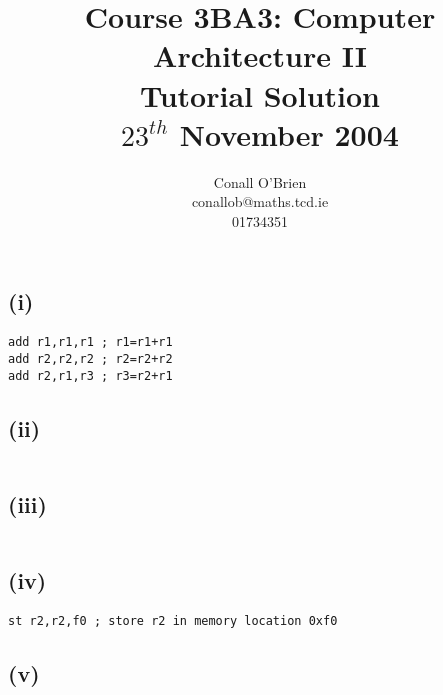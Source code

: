 \documentclass[a4paper,12pt]{article}
\begin{document}
\title{Course 3BA3: Computer Architecture II \\ Tutorial Solution\\$23^{th}$ November 2004}

\author{Conall O'Brien \\ conallob@maths.tcd.ie \\ 01734351}

\maketitle

\section{}

\subsection*{(i)}

\begin{verbatim}
add r1,r1,r1 ; r1=r1+r1
add r2,r2,r2 ; r2=r2+r2
add r2,r1,r3 ; r3=r2+r1
\end{verbatim}

\subsection*{(ii)}

\begin{verbatim}
\end{verbatim}

\subsection*{(iii)}

\begin{verbatim}
\end{verbatim}

\subsection*{(iv)}

\begin{verbatim}
st r2,r2,f0 ; store r2 in memory location 0xf0
\end{verbatim}


\subsection*{(v)}
\end{document}
